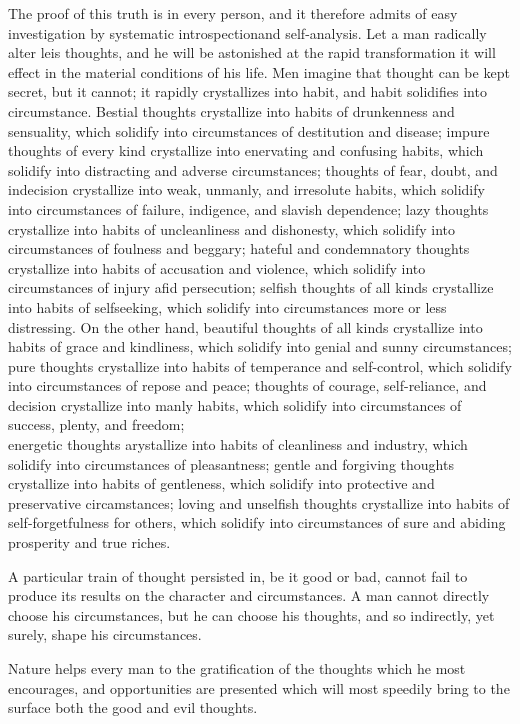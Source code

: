 \documentclass[10pt]{article}
\begin{document}
The proof of this truth is in every person, and it therefore admits of easy investigation by systematic introspectionand self-analysis. Let a man radically alter leis thoughts, and he will be astonished at the rapid transformation it will effect in the material conditions of his life. Men imagine that thought can be kept secret, but it cannot; it rapidly crystallizes into habit, and habit solidifies into circumstance. Bestial thoughts crystallize into habits of drunkenness and sensuality, which solidify into circumstances of destitution and disease; impure thoughts of every kind crystallize into enervating and confusing habits, which solidify into distracting and adverse circumstances; thoughts of fear, doubt, and indecision crystallize into weak, unmanly, and irresolute habits, which solidify into circumstances of failure, indigence, and slavish dependence; lazy thoughts crystallize into habits of uncleanliness and dishonesty, which solidify into circumstances of foulness and beggary; hateful and condemnatory thoughts crystallize into habits of accusation and violence, which solidify into circumstances of injury afid persecution; selfish thoughts of all kinds crystallize into habits of selfseeking, which solidify into circumstances more or less distressing. On the other hand, beautiful thoughts of all kinds crystallize into habits of grace and kindliness, which solidify into genial and sunny circumstances; pure thoughts crystallize into habits of temperance and self-control, which solidify into circumstances of repose and peace; thoughts of courage, self-reliance, and decision crystallize into manly habits, which solidify into circumstances of success, plenty, and freedom;\\
energetic thoughts arystallize into habits of cleanliness and industry, which solidify into circumstances of pleasantness; gentle and forgiving thoughts crystallize into habits of gentleness, which solidify into protective and preservative circamstances; loving and unselfish thoughts crystallize into habits of self-forgetfulness for others, which solidify into circumstances of sure and abiding prosperity and true riches.

A particular train of thought persisted in, be it good or bad, cannot fail to produce its results on the character and circumstances. A man cannot directly choose his circumstances, but he can choose his thoughts, and so indirectly, yet surely, shape his circumstances.

Nature helps every man to the gratification of the thoughts which he most encourages, and opportunities are presented which will most speedily bring to the surface both the good and evil thoughts.
\end{document}
